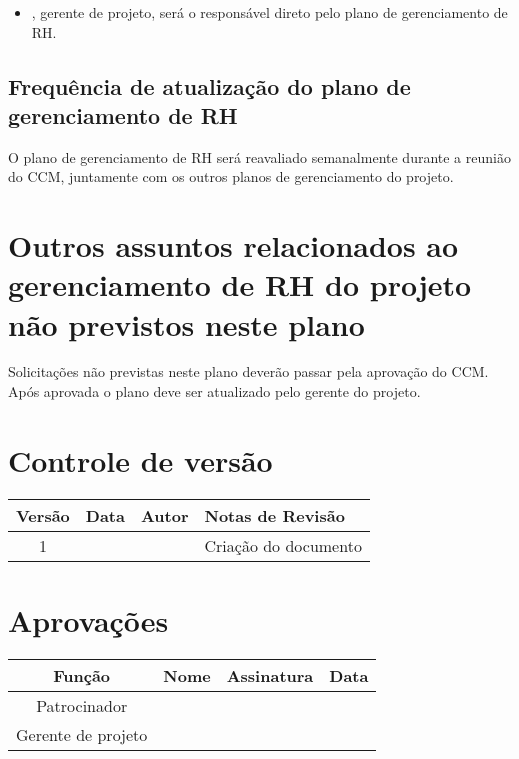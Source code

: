 \begin{itemize}
	\item \projectManagerName{}, gerente de projeto, será o responsável direto pelo plano de gerenciamento de RH.
\end{itemize}

\subsection{Frequência de atualização do plano de gerenciamento de RH}

O plano de gerenciamento de RH será reavaliado semanalmente durante a reunião do CCM, juntamente com os outros planos de gerenciamento do projeto.

\section{Outros assuntos relacionados ao gerenciamento de RH do projeto não previstos neste plano}

Solicitações não previstas neste plano deverão passar pela aprovação do CCM. Após aprovada o plano deve ser atualizado pelo gerente do projeto.

\section{Controle de versão}

\begin{table}[H]
	\begin{tabularx}{\textwidth}{| c | c | X | X |}
		\hline
		\textbf{Versão} & \textbf{Data} & \textbf{Autor}        & \textbf{Notas de Revisão} \\
		\hline
		1                &               & \projectManagerName{} & Criação do documento     \\
		\hline
	\end{tabularx}
	\centering
\end{table}

\section{Aprovações}

\begin{table}[H]
	\begin{tabularx}{\textwidth}{| c | c | X | c |}
		\hline
		\textbf{Função}  & \textbf{Nome}         & \textbf{Assinatura}        & \textbf{Data} \\
		\hline
		Patrocinador       & \projectSponsorName{} & \projectSponsorSignature{} &               \\
		\hline
		Gerente de projeto & \projectManagerName{} & \projectManagerSignature{} &               \\
		\hline
	\end{tabularx}
	\centering
\end{table}